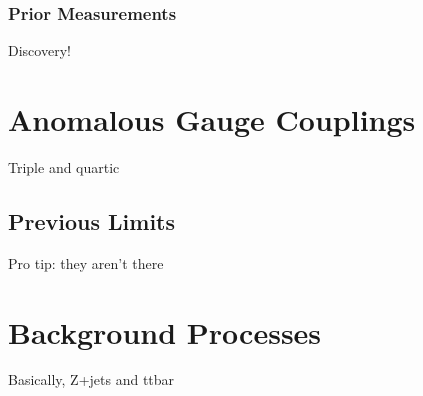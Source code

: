 \subsubsection{Prior Measurements}\label{sec:Hresults}
Discovery!



\section{Anomalous Gauge Couplings}
Triple and quartic

\subsection{Previous Limits}
Pro tip: they aren't there



\section{Background Processes}
Basically, Z+jets and ttbar
